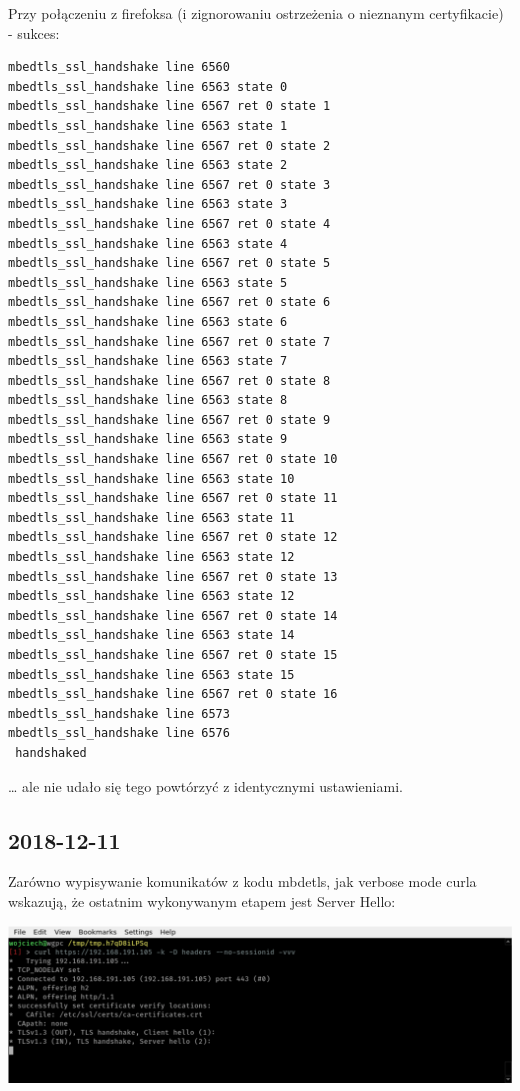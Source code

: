 Przy połączeniu z firefoksa (i zignorowaniu ostrzeżenia o nieznanym certyfikacie) - sukces:
\begin{verbatim}
mbedtls_ssl_handshake line 6560
mbedtls_ssl_handshake line 6563 state 0
mbedtls_ssl_handshake line 6567 ret 0 state 1
mbedtls_ssl_handshake line 6563 state 1
mbedtls_ssl_handshake line 6567 ret 0 state 2
mbedtls_ssl_handshake line 6563 state 2
mbedtls_ssl_handshake line 6567 ret 0 state 3
mbedtls_ssl_handshake line 6563 state 3
mbedtls_ssl_handshake line 6567 ret 0 state 4
mbedtls_ssl_handshake line 6563 state 4
mbedtls_ssl_handshake line 6567 ret 0 state 5
mbedtls_ssl_handshake line 6563 state 5
mbedtls_ssl_handshake line 6567 ret 0 state 6
mbedtls_ssl_handshake line 6563 state 6
mbedtls_ssl_handshake line 6567 ret 0 state 7
mbedtls_ssl_handshake line 6563 state 7
mbedtls_ssl_handshake line 6567 ret 0 state 8
mbedtls_ssl_handshake line 6563 state 8
mbedtls_ssl_handshake line 6567 ret 0 state 9
mbedtls_ssl_handshake line 6563 state 9
mbedtls_ssl_handshake line 6567 ret 0 state 10
mbedtls_ssl_handshake line 6563 state 10
mbedtls_ssl_handshake line 6567 ret 0 state 11
mbedtls_ssl_handshake line 6563 state 11
mbedtls_ssl_handshake line 6567 ret 0 state 12
mbedtls_ssl_handshake line 6563 state 12
mbedtls_ssl_handshake line 6567 ret 0 state 13
mbedtls_ssl_handshake line 6563 state 12
mbedtls_ssl_handshake line 6567 ret 0 state 14
mbedtls_ssl_handshake line 6563 state 14
mbedtls_ssl_handshake line 6567 ret 0 state 15
mbedtls_ssl_handshake line 6563 state 15
mbedtls_ssl_handshake line 6567 ret 0 state 16
mbedtls_ssl_handshake line 6573
mbedtls_ssl_handshake line 6576
 handshaked
\end{verbatim}

… ale nie udało się tego powtórzyć z identycznymi ustawieniami.

\subsection{2018-12-11}
Zarówno wypisywanie komunikatów z kodu mbdetls, jak verbose mode curla wskazują, że ostatnim wykonywanym etapem jest Server Hello:

\includegraphics[width=\linewidth]{./images/2.png}

